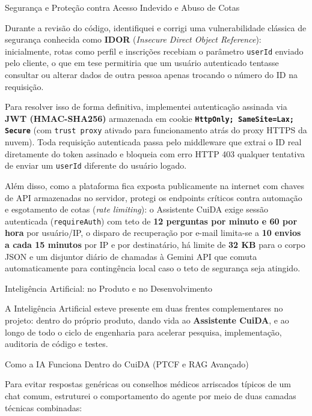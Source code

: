 \documentclass[11pt,a4paper]{article}
\newcommand{\tituloSecao}[1]{%
  \par\addvspace{12pt}%
  {\noindent\fontsize{20pt}{24pt}\selectfont\normalfont\color{headingBlue}#1\par}%
  \vspace{4pt}%
}
\newcommand{\subtituloSecao}[1]{%
  \par\addvspace{10pt}%
  {\noindent\fontsize{16pt}{20pt}\selectfont\normalfont\color{headingBlue}#1\par}%
  \vspace{3pt}%
}
\begin{document}
\subtituloSecao{Segurança e Proteção contra Acesso Indevido e Abuso de Cotas}

Durante a revisão do código, identifiquei e corrigi uma vulnerabilidade clássica de segurança conhecida como \textbf{IDOR} (\textit{Insecure Direct Object Reference}): inicialmente, rotas como perfil e inscrições recebiam o parâmetro \texttt{userId} enviado pelo cliente, o que em tese permitiria que um usuário autenticado tentasse consultar ou alterar dados de outra pessoa apenas trocando o número do ID na requisição.

Para resolver isso de forma definitiva, implementei autenticação assinada via \textbf{JWT (HMAC-SHA256)} armazenada em cookie \textbf{\texttt{HttpOnly; SameSite=Lax; Secure}} (com \texttt{trust proxy} ativado para funcionamento atrás do proxy HTTPS da nuvem). Toda requisição autenticada passa pelo middleware que extrai o ID real diretamente do token assinado e bloqueia com erro HTTP 403 qualquer tentativa de enviar um \texttt{userId} diferente do usuário logado.

Além disso, como a plataforma fica exposta publicamente na internet com chaves de API armazenadas no servidor, protegi os endpoints críticos contra automação e esgotamento de cotas (\textit{rate limiting}): o Assistente CuiDA exige sessão autenticada (\texttt{requireAuth}) com teto de \textbf{12 perguntas por minuto e 60 por hora} por usuário/IP, o disparo de recuperação por e-mail limita-se a \textbf{10 envios a cada 15 minutos} por IP e por destinatário, há limite de \textbf{32 KB} para o corpo JSON e um disjuntor diário de chamadas à Gemini API que comuta automaticamente para contingência local caso o teto de segurança seja atingido.

\tituloSecao{Inteligência Artificial: no Produto e no Desenvolvimento}

A Inteligência Artificial esteve presente em duas frentes complementares no projeto: dentro do próprio produto, dando vida ao \textbf{Assistente CuiDA}, e ao longo de todo o ciclo de engenharia para acelerar pesquisa, implementação, auditoria de código e testes.

\subtituloSecao{Como a IA Funciona Dentro do CuiDA (PTCF e RAG Avançado)}

Para evitar respostas genéricas ou conselhos médicos arriscados típicos de um chat comum, estruturei o comportamento do agente por meio de duas camadas técnicas combinadas:
\end{document}
